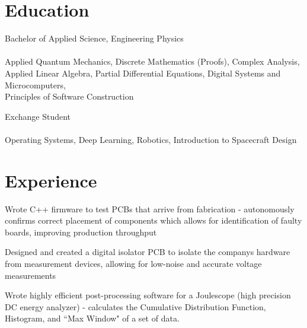 \documentclass[]{deedy-resume-openfont}
\begin{document}

\section{Education}

Bachelor of Applied Science, Engineering Physics \\
\vspace{5pt}
 \\
     Applied Quantum Mechanics, Discrete Mathematics (Proofs), Complex Analysis, \\ Applied Linear Algebra, Partial Differential Equations, Digital Systems and Microcomputers,\\Principles of Software Construction
\vspace{8pt}

Exchange Student \\
\vspace{5pt}
 \\
    Operating Systems, Deep Learning, Robotics, Introduction to Spacecraft Design
\vspace{10pt}

\section{Experience}

\begin{tightemize}
	\item Wrote C++ firmware to test PCBs that arrive from fabrication - autonomously confirms correct placement of components which allows for identification of faulty boards, improving production throughput
	\item Designed and created a digital isolator PCB to isolate the companys hardware from measurement devices, allowing for low-noise and accurate voltage measurements
	\item Wrote highly efficient post-processing software for a Joulescope (high precision DC energy analyzer) - calculates the Cumulative Distribution Function, Histogram, and ``Max Window" of a set of data.
\end{tightemize}
\vspace{8pt}
\end{document}
